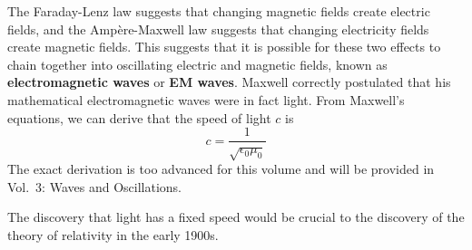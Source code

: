 The Faraday-Lenz law suggests that changing magnetic fields
create electric fields,
and the Ampère-Maxwell law suggests that changing electricity fields
create magnetic fields.
This suggests that it is possible for these two effects to chain together
into oscillating electric and magnetic fields,
known as \textbf{electromagnetic waves} or \textbf{EM waves}.
Maxwell correctly postulated that his mathematical electromagnetic waves
were in fact light.
From Maxwell's equations,
we can derive that the speed of light \(c\) is
\begin{equation}
    c = \frac{1}{\sqrt{\epsilon_0 \mu_0}}
\end{equation}
The exact derivation is too advanced for this volume
and will be provided in Vol.~3: Waves and Oscillations.

The discovery that light has a fixed speed would be crucial to the
discovery of the theory of relativity in the early 1900s.
